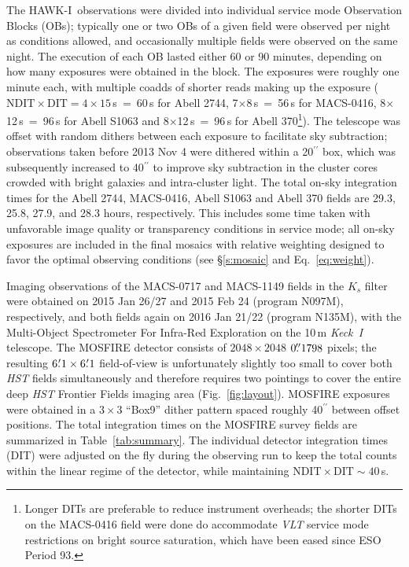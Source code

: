 \documentclass[preprint2]{aastex6}
\gdef\HAWKI{\mbox{HAWK-I}}
\begin{document}
The \HAWKI\ observations were divided into individual service mode Observation Blocks (OBs); typically one or two OBs of a given field were observed per night as conditions allowed, and occasionally multiple fields were observed on the same night.  The execution of each OB lasted either 60 or 90 minutes, depending on how many exposures were obtained in the block.  The exposures were roughly one minute each, with multiple coadds of shorter reads making up the exposure ($\mathrm{NDIT}\times\mathrm{DIT} = 4\times15$\,s~=~60\,s for Abell 2744, 7$\times$8\,s~=~56\,s for MACS-0416, 8$\times$12\,s~=~96\,s for Abell S1063 and 8$\times$12\,s~=~96\,s for Abell 370\footnote{Longer DITs are preferable to reduce instrument overheads; the shorter DITs on the MACS-0416 field were done do accommodate \textit{VLT} service mode restrictions on bright source saturation, which have been eased since ESO Period 93.}).  The telescope was offset with random dithers between each exposure to facilitate sky subtraction;  observations taken before 2013 Nov 4 were dithered within a 20$^{\prime\prime}$ box, which was subsequently increased to 40$^{\prime\prime}$ to improve sky subtraction in the cluster cores crowded with bright galaxies and intra-cluster light.  The total on-sky integration times for the Abell 2744, MACS-0416, Abell S1063 and Abell 370 fields are 29.3, 25.8, 27.9, and 28.3 hours, respectively.  This includes some time taken with unfavorable image quality or transparency conditions in service mode;  all on-sky exposures are included in the final mosaics with relative weighting designed to favor the optimal observing conditions (see \S\ref{s:mosaic} and Eq.~\ref{eq:weight}).


Imaging observations of the MACS-0717 and MACS-1149 fields in the $K_s$ filter were obtained on 2015 Jan 26/27 and 2015 Feb 24 (program N097M), respectively, and both fields again on 2016 Jan 21/22 (program N135M), with the Multi-Object Spectrometer For Infra-Red Exploration \citep[MOSFIRE;][]{mosfire} on the 10\,m \mbox{\textit{Keck I}} telescope.  The MOSFIRE detector consists of $2048\times2048$ $0\mbox{$.\!\!^{\prime\prime}$}1798$ pixels; the resulting $6\mbox{$.\mkern-4mu^\prime$}1\times6\mbox{$.\mkern-4mu^\prime$}1$ field-of-view is unfortunately slightly too small to cover both \textit{HST} fields simultaneously and therefore requires two pointings to cover the entire deep \textit{HST} Frontier Fields imaging area (Fig.~\ref{fig:layout}).  MOSFIRE exposures were obtained in a $3\times3$ ``Box9'' dither pattern spaced roughly 40$^{\prime\prime}$ between offset positions.  The total integration times on the MOSFIRE survey fields are summarized in Table~\ref{tab:summary}.  The individual detector integration times (DIT) were adjusted on the fly during the observing run to keep the total counts within the linear regime of the detector, while maintaining $\mathrm{NDIT}\times\mathrm{DIT} \sim 40$\,s.
\end{document}
